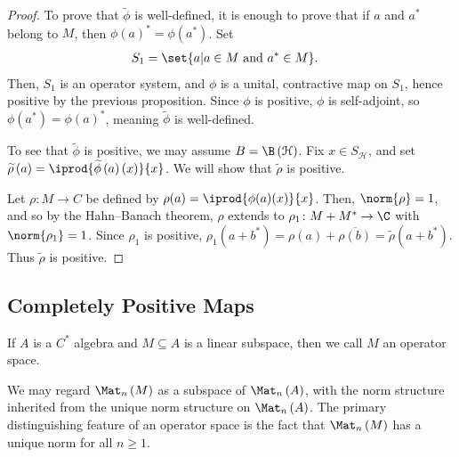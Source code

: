 \documentclass[10pt]{mypackage}
\begin{document}
\begin{proof}
  To prove that $ \widetilde{\phi} $ is well-defined, it is enough to prove that if $a$ and $a^{\ast}$ belong to $M$, then $\phi\left( a \right)^{\ast} = \phi\left( a^{\ast} \right)$. Set
  \begin{align*}
    S_1 &= \set{a | a\in M\text{ and }a^{\ast}\in M}.
  \end{align*}
  Then, $S_1$ is an operator system, and $\phi$ is a unital, contractive map on $S_1$, hence positive by the previous proposition. Since $\phi$ is positive, $\phi$ is self-adjoint, so $\phi\left( a^{\ast} \right) = \phi\left( a \right)^{\ast}$, meaning $\widetilde{\phi}$ is well-defined.\newline

  To see that $\widetilde{\phi}$ is positive, we may assume $B = \B\left( \mathcal{H} \right)$. Fix $x\in S_{\mathcal{H}}$, and set $\widetilde{\rho}\left( a \right) = \iprod{\widetilde{\phi}\left( a \right)\left( x \right)}{x}$. We will show that $\widetilde{\rho}$ is positive.\newline

  Let $\rho\colon M\rightarrow C$ be defined by $\rho(a) = \iprod{\phi(a)(x)}{x}$. Then, $\norm{\rho} = 1$, and so by the Hahn--Banach theorem, $\rho$ extends to $\rho_1\colon M + M^{\ast}\rightarrow \C$ with $\norm{\rho_1} = 1$. Since $\rho_1$ is positive, $\rho_1\left( a + b^{\ast} \right) = \rho\left( a \right) + \overline{\rho\left( b \right)} = \widetilde{\rho}\left( a + b^{\ast} \right)$. Thus $\widetilde{\rho}$ is positive.
\end{proof}
\subsection{Completely Positive Maps}%
\begin{definition}
  If $A$ is a $C^{\ast}$ algebra and $M\subseteq A$ is a linear subspace, then we call $M$ an operator space. 
\end{definition}
We may regard $\Mat_n\left( M \right)$ as a subspace of $\Mat_n\left( A \right)$, with the norm structure inherited from the unique norm structure on $\Mat_n\left( A \right)$. The primary distinguishing feature of an operator space is the fact that $\Mat_n\left( M \right)$ has a unique norm for all $n\geq 1$.\newline
\end{document}

